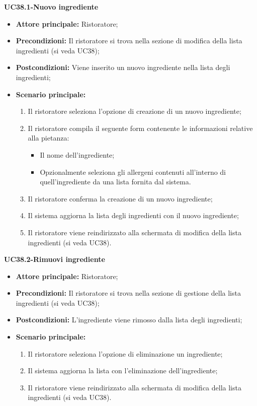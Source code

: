 \pagebreak
\textbf{UC38.1-Nuovo ingrediente}
\begin{itemize}
    \item \textbf{Attore principale:} Ristoratore;
    \item \textbf{Precondizioni:} Il ristoratore si trova nella sezione di modifica della lista ingredienti (si veda UC38);
    \item \textbf{Postcondizioni:} Viene inserito un nuovo ingrediente nella lista degli ingredienti;
    \item \textbf{Scenario principale:}
    \begin{enumerate}
        \item Il ristoratore seleziona l'opzione di creazione di un nuovo ingrediente;
        \item Il ristoratore compila il seguente form contenente le informazioni relative alla pietanza:
        \begin{itemize}
            \item Il nome dell'ingrediente;
            \item Opzionalmente seleziona gli allergeni contenuti all'interno di quell'ingrediente da una lista fornita dal sistema.
        \end{itemize}
        \item Il ristoratore conferma la creazione di un nuovo ingrediente;
        \item Il sistema aggiorna la lista degli ingredienti con il nuovo ingrediente;
        \item Il ristoratore viene reindirizzato alla schermata di modifica della lista ingredienti (si veda UC38).
    \end{enumerate}
\end{itemize}


\textbf{UC38.2-Rimuovi ingrediente}
\begin{itemize}
    \item \textbf{Attore principale:} Ristoratore;
    \item \textbf{Precondizioni:} Il ristoratore si trova nella sezione di gestione della lista ingredienti (si veda UC38);
    \item \textbf{Postcondizioni:} L'ingrediente viene rimosso dalla lista degli ingredienti;
    \item \textbf{Scenario principale:}
    \begin{enumerate}
        \item Il ristoratore seleziona l'opzione di eliminazione un ingrediente;
        \item Il sistema aggiorna la lista con l'eliminazione dell'ingrediente;
        \item Il ristoratore viene reindirizzato alla schermata di modifica della lista ingredienti (si veda UC38).
    \end{enumerate}
\end{itemize}
\pagebreak

